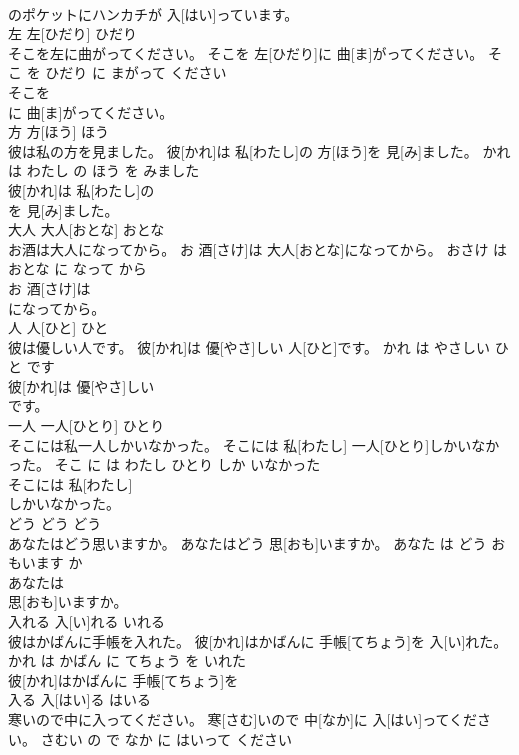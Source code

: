 \documentclass[8pt]{extreport}
\begin{document}
\begin{CJK}{UTF8}{min}
\\	のポケットにハンカチが 入[はい]っています。		
\\	左	左[ひだり]	ひだり	
\\	そこを左に曲がってください。	そこを 左[ひだり]に 曲[ま]がってください。	そこ を ひだり に まがって ください	
\\	そこを
\\	に 曲[ま]がってください。		
\\	方	方[ほう]	ほう	
\\	彼は私の方を見ました。	彼[かれ]は 私[わたし]の 方[ほう]を 見[み]ました。	かれ は わたし の ほう を みました	
\\	彼[かれ]は 私[わたし]の
\\	を 見[み]ました。		
\\	大人	大人[おとな]	おとな	
\\	お酒は大人になってから。	お 酒[さけ]は 大人[おとな]になってから。	おさけ は おとな に なって から	
\\	お 酒[さけ]は
\\	になってから。		
\\	人	人[ひと]	ひと	
\\	彼は優しい人です。	彼[かれ]は 優[やさ]しい 人[ひと]です。	かれ は やさしい ひと です	
\\	彼[かれ]は 優[やさ]しい
\\	です。		
\\	一人	一人[ひとり]	ひとり	
\\	そこには私一人しかいなかった。	そこには 私[わたし] 一人[ひとり]しかいなかった。	そこ に は わたし ひとり しか いなかった	
\\	そこには 私[わたし]
\\	しかいなかった。		
\\	どう	どう	どう	
\\	あなたはどう思いますか。	あなたはどう 思[おも]いますか。	あなた は どう おもいます か	
\\	あなたは
\\	思[おも]いますか。		
\\	入れる	入[い]れる	いれる	
\\	彼はかばんに手帳を入れた。	彼[かれ]はかばんに 手帳[てちょう]を 入[い]れた。	かれ は かばん に てちょう を いれた	
\\	彼[かれ]はかばんに 手帳[てちょう]を
\\	入る	入[はい]る	はいる	
\\	寒いので中に入ってください。	寒[さむ]いので 中[なか]に 入[はい]ってください。	さむい の で なか に はいって ください	

\end{CJK}
\end{document}
